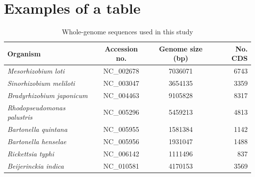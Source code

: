 
\section{Examples of a table}
\begin{table}
    \begin{center}
    \begin{tabular}{|l|c|c|r|}
    \hline
    {\sc Organism}  &  {\sc Accession no.}  & {\sc Genome size} (bp)  & {\sc No. CDS} \\
    \hline
    {\it Mesorhizobium loti}          & NC\_002678 & 7036071 & 6743 \\
    {\it Sinorhizobium meliloti}      & NC\_003047 & 3654135 & 3359 \\
    {\it Bradyrhizobium japonicum}    & NC\_004463 & 9105828 & 8317 \\
    {\it Rhodopseudomonas palustris}  & NC\_005296 & 5459213 & 4813 \\
    {\it Bartonella quintana}         & NC\_005955 & 1581384 & 1142 \\
    {\it Bartonella henselae}         & NC\_005956 & 1931047 & 1488 \\
    {\it Rickettsia typhi}            & NC\_006142 & 1111496 & 837 \\
    {\it Beijerinckia indica}         & NC\_010581 & 4170153 & 3569 \\
    \hline
    \end{tabular}
    \end{center}
    \caption{Whole-genome sequences used in this study}
    \label{table_genomes}
    \end{table}
    
